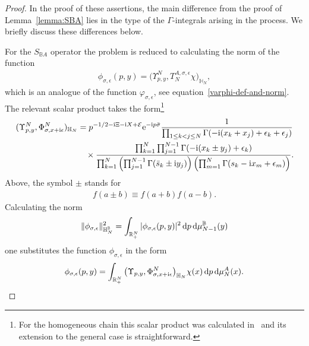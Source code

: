 \begin{proof}
In the proof of these assertions, the main difference from the proof of Lemma~\ref{lemma:SBA} lies in the type of the $\Gamma$-integrals
arising in the process. We briefly discuss these differences below.



For the $S_{\mathbb B A}$ operator the problem is reduced to calculating the norm of the function
\begin{gather*}
\phi_{\sigma,\epsilon}(p,y)= \big( \Upsilon^N_{p,y},T_N^{A,\sigma,\epsilon}\chi \big)_{ \mathbb{H}_N },
\end{gather*}
which is an analogue of the function $\varphi_{\sigma,\epsilon}$, see equation~\eqref{varphi-def-and-norm}. The relevant scalar product takes the
form\footnote{For the homogeneous chain this scalar product was calculated in~\cite{DMspinchainandSL2RGustafson} and its extension to the
general case is straightforward.}
\begin{gather*}
(\Upsilon^N_{p,y},\Phi^N_{\sigma,x+{\rm i}\epsilon})_{ \mathbb{H}_N }
= p^{-1/2 -{\rm i}\Xi-{\rm i}X+\mathcal E}{\rm e}^{-{\rm i}p\bar\sigma}
\frac1{ \prod_{1\leq k<j\leq N}\Gamma(-{\rm i}( x_k+ x_j)+\epsilon_k+\epsilon_j) }
\\ \hphantom{(\Upsilon^N_{p,y},\Phi^N_{\sigma,x+{\rm i}\epsilon})_{ \mathbb{H}_N }=}
{}\times \frac{\prod_{k=1}^{N}\prod_{j=1}^{N-1} \Gamma(-{\rm i}(x_k\pm y_j)+\epsilon_k)}{
\prod_{k=1}^N\left(\prod_{j=1}^{N-1} \Gamma(\bar s_k\pm {\rm i}y_j)\right) \left(\prod_{m=1}^{N}\Gamma( s_k-{\rm i}x_m+\epsilon_m)\right)}.
\end{gather*}
 Above, the symbol $\pm$ stands for
\begin{gather*}
f(a \pm b) \equiv f(a+b)f(a-b) .
\end{gather*}
Calculating the norm
\begin{gather*}
\|\phi_{\sigma,\epsilon}\|^2_{\mathbb H_N^{\mathbb B}} =\int_{\mathbb R_+^N}
 |\phi_{\sigma,\epsilon}(p,y)|^2 \,{\rm d}p \,{\rm d}\mu_{N-1}^{\mathbb B}(y)
\end{gather*}
one substitutes the function $\phi_{\sigma,\epsilon}$ in the form
\begin{gather*}
\phi_{\sigma,\epsilon}(p,y)=\int_{\mathbb R_+^N} \big( \Upsilon_{p,y},\Phi^N_{\sigma,x+{\rm i}\epsilon}\big)_{ \mathbb{H}_N } \chi(x) \,{\rm d}p\,{\rm d}\mu_N^A(x).
\end{gather*}

\end{proof}
